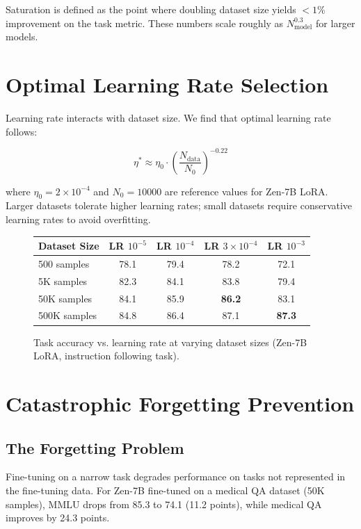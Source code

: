 \documentclass[11pt,a4paper]{article}
\begin{document}
Saturation is defined as the point where doubling dataset size yields $<1\%$
improvement on the task metric. These numbers scale roughly as $N_\text{model}^{0.3}$
for larger models.

\section{Optimal Learning Rate Selection}

Learning rate interacts with dataset size. We find that optimal learning rate
follows:

\begin{equation}
\eta^* \approx \eta_0 \cdot \left(\frac{N_\text{data}}{N_0}\right)^{-0.22}
\end{equation}

where $\eta_0 = 2\times10^{-4}$ and $N_0 = 10000$ are reference values for Zen-7B
LoRA. Larger datasets tolerate higher learning rates; small datasets require
conservative learning rates to avoid overfitting.

\begin{figure}[H]
\centering
\begin{tabular}{lcccc}
\toprule
\textbf{Dataset Size} & \textbf{LR $10^{-5}$} & \textbf{LR $10^{-4}$} & \textbf{LR $3\times10^{-4}$} & \textbf{LR $10^{-3}$} \\
\midrule
500 samples & 78.1 & 79.4 & 78.2 & 72.1 \\
5K samples & 82.3 & 84.1 & 83.8 & 79.4 \\
50K samples & 84.1 & 85.9 & \textbf{86.2} & 83.1 \\
500K samples & 84.8 & 86.4 & 87.1 & \textbf{87.3} \\
\bottomrule
\end{tabular}
\caption{Task accuracy vs. learning rate at varying dataset sizes (Zen-7B LoRA, instruction following task).}
\end{figure}

\section{Catastrophic Forgetting Prevention}

\subsection{The Forgetting Problem}

Fine-tuning on a narrow task degrades performance on tasks not represented in
the fine-tuning data. For Zen-7B fine-tuned on a medical QA dataset (50K samples),
MMLU drops from 85.3 to 74.1 (11.2 points), while medical QA improves by 24.3 points.
\end{document}
